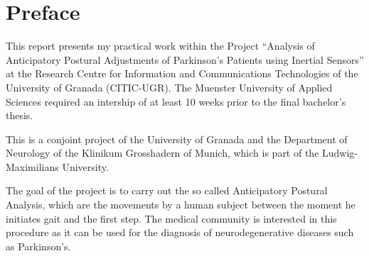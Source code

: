 \chapter*{Preface}

This report presents my practical work within the Project ``Analysis of Anticipatory Postural Adjustments of Parkinson's Patients using Inertial Sensors'' at the Research Centre for Information and Communications Technologies of the University of Granada (CITIC-UGR). The Muenster University of Applied Sciences required an intership of at least 10 weeks prior to the final bachelor's thesis.

This is a conjoint project of the University of Granada and the Department of Neurology of the Klinikum Grosshadern of Munich, which is part of the Ludwig-Maximilians University.

The goal of the project is to carry out the so called Anticipatory Postural Analysis, which are the movements by a human subject between the moment he initiates gait and the first step. The medical community is interested in this procedure as it can be used for the diagnosis of neurodegenerative diseases such as Parkinson's.